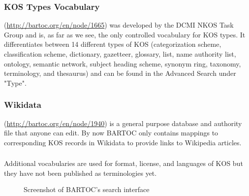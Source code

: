 \documentclass[12pt,a4paper]{llncs}
\begin{document}
\subsubsection{KOS Types Vocabulary}
(\href{http://bartoc.org/en/node/1665}{http://bartoc.org/en/node/1665})
was developed by the DCMI NKOS Task Group \cite{KOSTypes} and is, as far as we see, the only controlled vocabulary for KOS types. It differentiates between 14 different types of KOS (categorization scheme, classification scheme, dictionary, gazetteer, glossary, list, name authority list, ontology, semantic network, subject heading scheme, synonym ring, taxonomy, terminology, and thesaurus) and can be found in the Advanced Search under "Type".

\subsubsection{Wikidata}
(\href{http://bartoc.org/en/node/1940}{http://bartoc.org/en/node/1940})
is a general purpose database and authority file that anyone can edit. By now BARTOC only contains mappings to corresponding KOS records in Wikidata to provide links to Wikipedia articles.

\subsubsection{}\hspace{-0.4em}%
Additional vocabularies are used for format, license, and languages of KOS but they have not been published as terminologies yet.
\pagebreak

\begin{figure}\centering
{}
\caption{Screenshot of BARTOC's search interface}
\end{figure}
\end{document}
